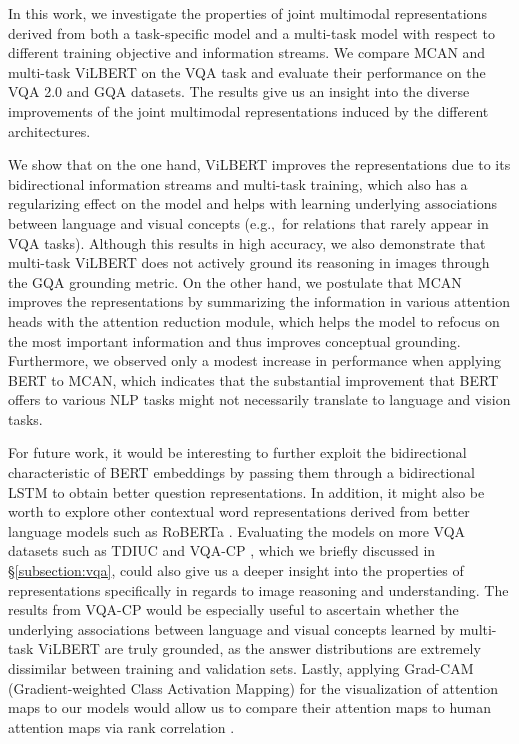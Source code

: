 \documentclass{article}
\begin{document}
In this work, we investigate the properties of joint multimodal representations derived from both a task-specific model and a multi-task model with respect to different training objective and information streams. We compare MCAN and multi-task ViLBERT on the VQA task and evaluate their performance on the VQA 2.0 and GQA datasets. The results give us an insight into the diverse improvements of the joint multimodal representations induced by the different architectures.

We show that on the one hand, ViLBERT improves the representations due to its bidirectional information streams and multi-task training, which also has a regularizing effect on the model and helps with learning underlying associations between language and visual concepts (e.g.,\ for relations that rarely appear in VQA tasks). Although this results in high accuracy, we also demonstrate that multi-task ViLBERT does not actively ground its reasoning in images through the GQA grounding metric. On the other hand, we postulate that MCAN improves the representations by summarizing the information in various attention heads with the attention reduction module, which helps the model to refocus on the most important information and thus improves conceptual grounding. Furthermore, we observed only a modest increase in performance when applying BERT to MCAN, which indicates that the substantial improvement that BERT offers to various NLP tasks might not necessarily translate to language and vision tasks. %

For future work, it would be interesting to further exploit the bidirectional characteristic of BERT embeddings by passing them through a bidirectional LSTM to obtain better question representations. In addition, it might also be worth to explore other contextual word representations derived from better language models such as RoBERTa \citep{liu2019roberta}. Evaluating the models on more VQA datasets such as TDIUC \citep{kafle2017tdiuc} and VQA-CP \citep{agrawal12018gvqa}, which we briefly discussed in \S \ref{subsection:vqa}, could also give us a deeper insight into the properties of representations specifically in regards to image reasoning and understanding. The results from VQA-CP would be especially useful to ascertain whether the underlying associations between language and visual concepts learned by multi-task ViLBERT are truly grounded, as the answer distributions are extremely dissimilar between training and validation sets. Lastly, applying Grad-CAM (Gradient-weighted Class Activation Mapping) \citep{selvaraju2017gradcam} for the visualization of attention maps to our models would allow us to compare their attention maps to human attention maps via rank correlation \citep{das2016human}.
\end{document}
